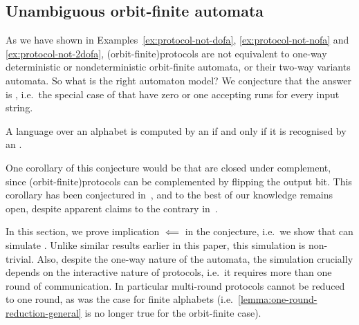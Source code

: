 \subsection{Unambiguous orbit-finite automata}
\label{sec:unambiguous-orbit-finite-automata}
\AP
As we have shown in Examples~\ref{ex:protocol-not-dofa},
\ref{ex:protocol-not-nofa} and \ref{ex:protocol-not-2dofa},
\kl(orbit-finite){protocols} are not equivalent to one-way deterministic or
nondeterministic orbit-finite automata, or their two-way variants automata. So
what is the right automaton model?  We conjecture that the answer is
, i.e.~the special case of
 that have zero or one accepting runs for
every input string.

\begin{conjecture}
    \label{conj:protocols-unambiguous}
    A language over an  alphabet is computed by 
    an  if and only if it is recognised by an .
\end{conjecture}

One corollary of this conjecture would be that  are closed under complement, since \kl(orbit-finite){protocols} can
be complemented by flipping the output bit. This corollary has been conjectured
in~\cite[p.9]{colcombet2012forms}, and to the best of our knowledge remains
open, despite apparent claims to the contrary in~\cite[Footnote
5]{colcombet2015unambiguity}.

In this section, we prove implication $\impliedby$ in the conjecture, i.e.~we
show that  can simulate . Unlike similar results earlier in this paper, this simulation is
non-trivial. Also, despite the one-way nature of the automata, the simulation
crucially depends on the interactive nature of protocols, i.e.~it requires more
than one round of communication. In particular multi-round protocols cannot be
reduced to one round, as was the case for finite alphabets
(i.e.~\cref{lemma:one-round-reduction-general} is no longer true for the
orbit-finite case).

